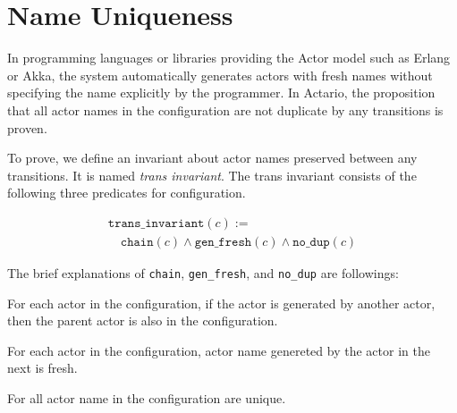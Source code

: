\section{Name Uniqueness}
\label{sec:uniqueness}
In programming languages or libraries providing the Actor model such as Erlang or Akka,
the system automatically generates actors with fresh names without specifying the name explicitly by the programmer.
In Actario, the proposition that all actor names in the configuration are not duplicate by any transitions is proven.


To prove, we define an invariant about actor names preserved between any transitions. It is named \textit{trans invariant}.
The trans invariant consists of the following three predicates for configuration.

\begin{displaymath}
  \begin{array}{l}
    \texttt{trans\_invariant}(c) := \\
    \quad \texttt{chain}(c) \wedge \texttt{gen\_fresh}(c) \wedge \texttt{no\_dup}(c)
  \end{array}
\end{displaymath}

The brief explanations of \texttt{chain}, \texttt{gen\_fresh}, and \texttt{no\_dup} are followings:

\begin{description}[style=nextline,leftmargin=12pt,parsep=0pt]
\item[\texttt{chain}]
  For each actor in the configuration, if the actor is generated by another actor, then the parent actor is also in the configuration.
\item[\texttt{gen\_fresh}]
  For each actor in the configuration, actor name genereted by the actor in the next is fresh.
\item[\texttt{no\_dup}]
  For all actor name in the configuration are unique.
\end{description}

